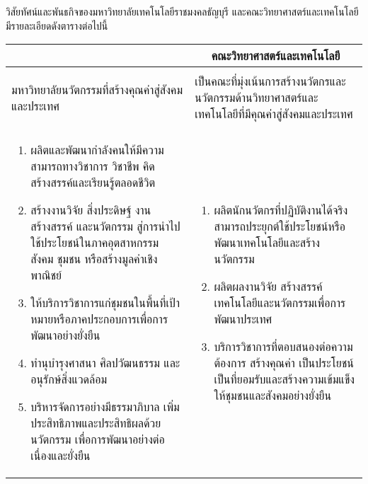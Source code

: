 
วิสัยทัศน์และพันธกิจของมหาวิทยาลัยเทคโนโลยีราชมงคลธัญบุรี และคณะวิทยาศาสตร์และเทคโนโลยี มีรายละเอียดดังตารางต่อไปนี้

\begin{center}
\begin{tabular}{|>{\raggedright}p{}|p{}|}
\hline
\multicolumn{1}{|c|}{\textbf{มหาวิทยาลัยเทคโนโลยีราชมงคลธัญบุรี}} & \multicolumn{1}{c|}{\textbf{คณะวิทยาศาสตร์และเทคโนโลยี}} \\
\hline
\multicolumn{2}{|c|}{วิสัยทัศน์ (Vision)} \\
\hline
มหาวิทยาลัยนวัตกรรมที่สร้างคุณค่าสู่สังคมและประเทศ & 
เป็นคณะที่มุ่งเน้นการสร้างนวัตกรและนวัตกรรมด้านวิทยาศาสตร์และเทคโนโลยีที่มีคุณค่าสู่สังคมและประเทศ  \\
\hline
\multicolumn{2}{|c|}{พันธกิจ (Mission)} \\
\hline
\vspace{-0.7cm}
\begin{enumerate}
\item ผลิตและพัฒนากำลังคนให้มีความสามารถทางวิชาการ วิชาชีพ คิดสร้างสรรค์และเรียนรู้ตลอดชีวิต
\item สร้างงานวิจัย สิ่งประดิษฐ์ งานสร้างสรรค์ และนวัตกรรม สู่การนำไปใช้ประโยชน์ในภาคอุตสาหกรรม สังคม ชุมชน หรือสร้างมูลค่าเชิงพาณิชย์
\item ให้บริการวิชาการแก่ชุมชนในพื้นที่เป้าหมายหรือภาคประกอบการเพื่อการพัฒนาอย่างยั่งยืน
\item ทำนุบำรุงศาสนา ศิลปวัฒนธรรม และอนุรักษ์สิ่งแวดล้อม
\item บริหารจัดการอย่างมีธรรมาภิบาล \newline เพิ่มประสิทธิภาพและประสิทธิผลด้วยนวัตกรรม เพื่อการพัฒนาอย่างต่อเนื่องและยั่งยืน
\end{enumerate}
&
\vspace{-0.7cm}
\begin{enumerate}
\item ผลิตนักนวัตกรที่ปฏิบัติงานได้จริง สามารถประยุกต์ใช้ประโยชน์หรือพัฒนาเทคโนโลยีและสร้างนวัตกรรม
\item ผลิตผลงานวิจัย สร้างสรรค์เทคโนโลยีและนวัตกรรมเพื่อการพัฒนาประเทศ
\item บริการวิชาการที่ตอบสนองต่อความต้องการ สร้างคุณค่า เป็นประโยชน์ เป็นที่ยอมรับและสร้างความเข้มแข็งให้ชุมชนและสังคมอย่างยั่งยืน
\end{enumerate} \\
\hline
\end{tabular}
\end{center}

